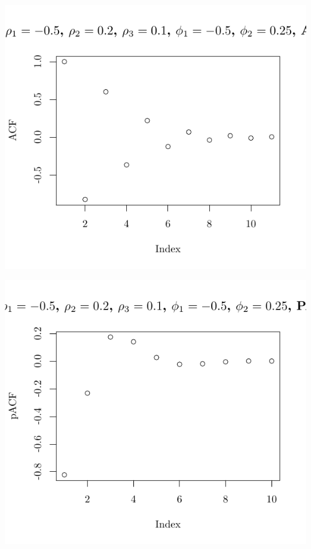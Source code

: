 \documentclass[10pt]{paper}\usepackage[]{graphicx}\usepackage[]{color}
\makeatletter
\def\maxwidth{ %
  \ifdim\Gin@nat@width>\linewidth
    \linewidth
  \else
    \Gin@nat@width
  \fi
}
\newenvironment{knitrout}{}{} %
\makeatother
\begin{document}
\begin{knitrout}
{\centering \includegraphics[width=\maxwidth]{figure/graphics-plotter-171} 

}




{\centering \includegraphics[width=\maxwidth]{figure/graphics-plotter-172} 

}





\end{knitrout}
\end{document}
